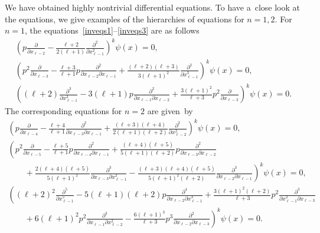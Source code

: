 \documentclass[pdftex]{sigma}
\numberwithin{equation}{section}
\begin{document}
We have obtained highly nontrivial dif\/ferential equations.
To have a~close look at the equations, we give examples of the hierarchies of equations for $ n = 1, 2$.
For $n=1 $, the equations~\eqref{inveqs1}--\eqref{inveqs3} are as follows
\begin{gather*}
    \left(p \frac{\partial}{\partial x_{\ell-2}} - \frac{\ell+2}{2(\ell+1)} \frac{\partial^2}{\partial x_{\ell-1}^2}
\right)^k \psi(x) = 0,
\\
    \left(p^2 \frac{\partial}{\partial x_{\ell-3}} - \frac{\ell+3}{\ell+1} p \frac{\partial^2}{\partial x_{\ell-2}
\partial x_{\ell-1}} + \frac{(\ell+2) (\ell+3)}{3(\ell+1)^2} \frac{\partial^3}{\partial x_{\ell-1}^3} \right)^k \psi(x)
= 0,
\\
    \left((\ell+2) \frac{\partial^3}{\partial x_{\ell-1}^3} - 3(\ell+1) p \frac{\partial^2}{\partial x_{\ell-1} \partial
x_{\ell-2}} + \frac{3(\ell+1)^2}{\ell+3} p^2 \frac{\partial}{\partial x_{\ell-3}} \right)^k \psi(x) = 0.
\end{gather*}
The corresponding equations for $ n = 2 $ are given~by
\begin{gather*}
    \left(p \frac{\partial}{\partial x_{\ell-4}} - \frac{\ell+4}{\ell+1} \frac{\partial^2}{\partial x_{\ell-3} \partial
x_{\ell-1}} + \frac{(\ell+3)(\ell+4)}{2(\ell+1)(\ell+2)} \frac{\partial^2}{\partial x_{\ell-2}^2} \right)^k \psi(x) = 0,
\\     \left(p^2 \frac{\partial}{\partial x_{\ell-5}} - \frac{\ell+5}{\ell+1} p \frac{\partial^2}{\partial
x_{\ell-4} \partial x_{\ell-1}} + \frac{(\ell+4)(\ell+5)}{5(\ell+1)(\ell+2)} p \frac{\partial^2}{\partial x_{\ell-3}
\partial x_{\ell-2}} \right.
\nonumber
\\
    \left.
\qquad{}
+ \frac{2(\ell+4)(\ell+5)}{5 (\ell+1)^2} \frac{\partial^3}{\partial x_{\ell-3} \partial x_{\ell-1}^2} -
\frac{(\ell+3)(\ell+4)(\ell+5)}{5(\ell+1)^2(\ell+2)} \frac{\partial^3}{\partial x_{\ell-2} \partial x_{\ell-1}}
\right)^k \psi(x) = 0,
\nonumber
\\
    \left((\ell+2)^2 \frac{\partial^5}{\partial x_{\ell-1}^5} - 5(\ell+1)(\ell+2) p \frac{\partial^4}{\partial
x_{\ell-2} \partial x_{\ell-1}^3} + \frac{3(\ell+1)^2 (\ell+2)}{\ell+3} p^2 \frac{\partial^3}{\partial x_{\ell-1}^2
\partial x_{\ell-3}} \right.
\nonumber
\\
    \left.
\qquad{}
+ 6 (\ell+1)^2 p^2 \frac{\partial^3}{\partial x_{\ell-1} \partial x_{\ell-2}^2} -\frac{6(\ell+1)^3}{\ell+3} p^3
\frac{\partial^2}{\partial x_{\ell-2} \partial x_{\ell-3}} \right)^k \psi(x) = 0.
\end{gather*}
\end{document}
